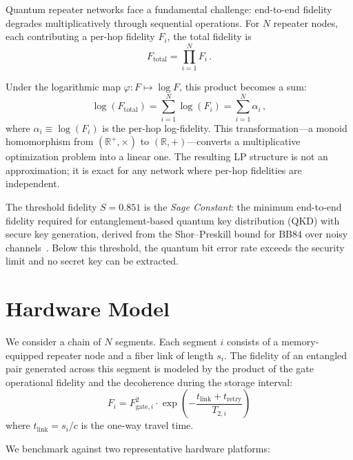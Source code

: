 \documentclass[aps,pra,reprint,amsmath,amssymb,superscriptaddress]{revtex4-2}
\begin{document}
Quantum repeater networks face a fundamental challenge: end-to-end fidelity degrades multiplicatively through sequential operations. For $N$ repeater nodes, each contributing a per-hop fidelity $F_i$, the total fidelity is
\begin{equation}
F_{\text{total}} = \prod_{i=1}^{N} F_i \,.
\label{eq:multiplicative}
\end{equation}

Under the logarithmic map $\varphi: F \mapsto \log F$, this product becomes a sum:
\begin{equation}
\log(F_{\text{total}}) = \sum_{i=1}^{N} \log(F_i) = \sum_{i=1}^{N} \alpha_i \,,
\label{eq:additive}
\end{equation}
where $\alpha_i \equiv \log(F_i)$ is the per-hop log-fidelity. This transformation---a monoid homomorphism from $(\mathbb{R}^+, \times)$ to $(\mathbb{R}, +)$---converts a multiplicative optimization problem into a linear one. The resulting LP structure is not an approximation; it is exact for any network where per-hop fidelities are independent.

The threshold fidelity $S = 0.851$ is the \emph{Sage Constant}: the minimum end-to-end fidelity required for entanglement-based quantum key distribution (QKD) with secure key generation, derived from the Shor--Preskill bound for BB84 over noisy channels~\cite{shor2000}. Below this threshold, the quantum bit error rate exceeds the security limit and no secret key can be extracted.


\section{Hardware Model}

We consider a chain of $N$ segments. Each segment $i$ consists of a memory-equipped repeater node and a fiber link of length $s_i$. The fidelity of an entangled pair generated across this segment is modeled by the product of the gate operational fidelity and the decoherence during the storage interval:
\begin{equation}
F_i = F_{\text{gate},i}^2 \cdot \exp\left( -\frac{t_{\text{link}} + t_{\text{retry}}}{T_{2,i}} \right)
\end{equation}
where $t_{\text{link}} = s_i/c$ is the one-way travel time. 

We benchmark against two representative hardware platforms:
\end{document}
